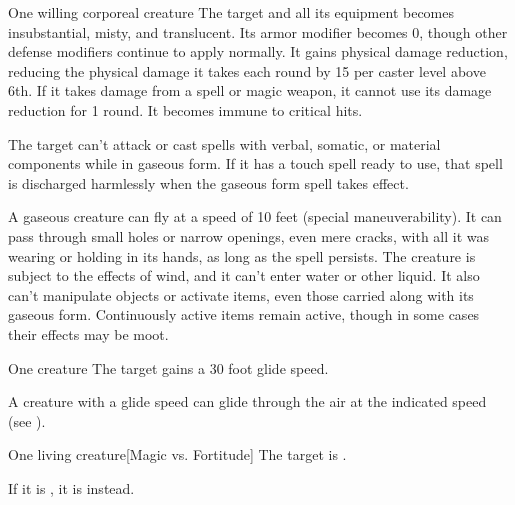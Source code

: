 \spellrng{\rngtouch}
\spelldur{\durshort \dismissable}
\begin{spelltarget}{One willing corporeal creature}
    \spelleffect The target and all its equipment becomes insubstantial, misty, and translucent. Its armor modifier becomes 0, though other defense modifiers continue to apply normally. It gains physical damage reduction, reducing the physical damage it takes each round by 15  per caster level above 6th. If it takes damage from a spell or magic weapon, it cannot use its damage reduction for 1 round. It becomes immune to critical hits.

    The target can't attack or cast spells with verbal, somatic, or material components while in gaseous form. If it has a touch spell ready to use, that spell is discharged harmlessly when the gaseous form spell takes effect.
    \par A gaseous creature can fly at a speed of 10 feet (special maneuverability). It can pass through small holes or narrow openings, even mere cracks, with all it was wearing or holding in its hands, as long as the spell persists. The creature is subject to the effects of wind, and it can't enter water or other liquid. It also can't manipulate objects or activate items, even those carried along with its gaseous form. Continuously active items remain active, though in some cases their effects may be moot.
\end{spelltarget}

\spellrng{\rngmed}
\spelldur{\durlong}
\begin{spelltarget}{One creature}
    \spelleffect The target gains a 30 foot glide speed.
\end{spelltarget}
\spellnotes A creature with a glide speed can glide through the air at the indicated speed (see ).

\spellrng{\rngmed}
\begin{spelltarget}{One living creature}[Magic vs. Fortitude]
    \spellsuccess The target is \sickened.

    If it is \bloodied, it is \nauseated instead.
\end{spelltarget}

